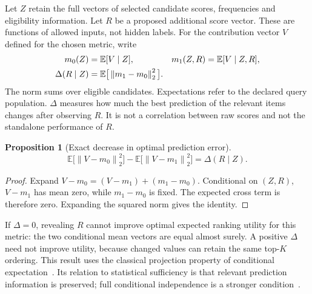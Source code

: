 \documentclass[11pt,a4paper]{article}
\newtheorem{proposition}{Proposition}
\newcommand{\E}{\mathbb E}
\newcommand{\norm}[1]{\left\lVert #1\right\rVert}
\begin{document}
Let $Z$ retain the full vectors of selected candidate scores, frequencies and
eligibility information. Let $R$ be a proposed additional score vector. These
are functions of allowed inputs, not hidden labels. For the contribution
vector $V$ defined for the chosen metric, write
\begin{align}
 m_0(Z)&=\E[V\mid Z], & m_1(Z,R)&=\E[V\mid Z,R],\notag\\
 \Delta(R\mid Z)&=\E\big[\norm{m_1-m_0}_2^2\big].
 \label{eq:delta}
\end{align}
The norm sums over eligible candidates. Expectations refer to the declared
query population. $\Delta$ measures how much the best prediction of the
relevant items changes after observing $R$. It is not a correlation between
raw scores and not the standalone performance of $R$.

\begin{proposition}[Exact decrease in optimal prediction error]
\begin{equation}
 \E\big[\norm{V-m_0}_2^2\big]
 -\E\big[\norm{V-m_1}_2^2\big]=\Delta(R\mid Z).
 \label{eq:projection}
\end{equation}
\end{proposition}
\begin{proof}
Expand $V-m_0=(V-m_1)+(m_1-m_0)$. Conditional on $(Z,R)$,
$V-m_1$ has mean zero, while $m_1-m_0$ is fixed. The expected cross term
is therefore zero. Expanding the squared norm gives the identity.
\end{proof}

If $\Delta=0$, revealing $R$ cannot improve optimal expected ranking utility
for this metric: the two conditional mean vectors are equal almost surely.
A positive $\Delta$ need not improve utility, because changed values can
retain the same top-$K$ ordering. This result uses the classical projection
property of conditional expectation~\cite{banerjee2005}. Its relation to
statistical sufficiency is that relevant prediction information is preserved;
full conditional independence is a stronger condition~\cite{fukumizu2004}.
\end{document}
